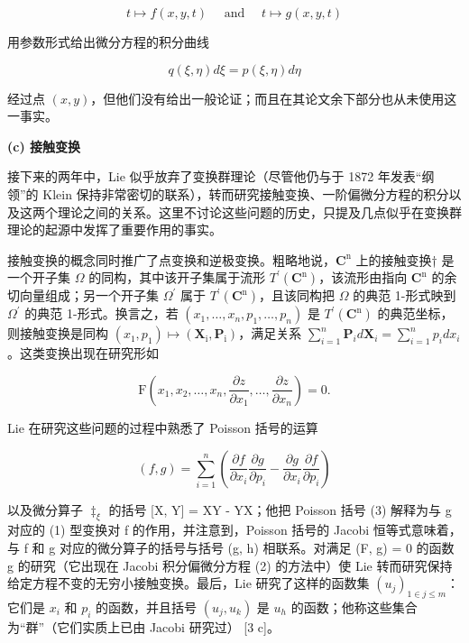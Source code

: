 \[
t \mapsto f (x, y, t) \quad \text { and } \quad t \mapsto g (x, y, t)
\]

用参数形式给出微分方程的积分曲线

\[
q (\xi , \eta) d \xi = p (\xi , \eta) d \eta
\]

经过点 \((x,y)\)，但他们没有给出一般论证；而且在其论文余下部分也从未使用这一事实。

\textbf{(c) 接触变换}

接下来的两年中，Lie 似乎放弃了变换群理论（尽管他仍与于 1872 年发表“纲领”的 Klein 保持非常密切的联系），转而研究接触变换、一阶偏微分方程的积分以及这两个理论之间的关系。这里不讨论这些问题的历史，只提及几点似乎在变换群理论的起源中发挥了重要作用的事实。

接触变换的概念同时推广了点变换和逆极变换。粗略地说，\(\mathbf{C}^{\mathrm{n}}\) 上的接触变换† 是一个开子集 \(\Omega\) 的同构，其中该开子集属于流形 \(T^{\prime}(\mathbf{C}^{\mathrm{n}})\)，该流形由指向 \(\mathbf{C}^{\mathrm{n}}\) 的余切向量组成；另一个开子集 \(\Omega^{\prime}\) 属于 \(T^{\prime}(\mathbf{C}^{\mathrm{n}})\)，且该同构把 \(\Omega\) 的典范 1-形式映到 \(\Omega^{\prime}\) 的典范 1-形式。换言之，若 \((x_{1},\ldots ,x_{n},p_{1},\ldots ,p_{n})\) 是 \(T^{\prime}(\mathbf{C}^{\mathrm{n}})\) 的典范坐标，则接触变换是同构 \((x_{1},p_{1})\mapsto (\mathbf{X}_{\mathrm{i}},\mathbf{P}_{\mathrm{i}})\)，满足关系 \(\sum_{i = 1}^{n}\mathbf{P}_{i}d\mathbf{X}_{i} = \sum_{i = 1}^{n}p_{i}dx_{i}\)。这类变换出现在研究形如

\[
\mathrm{F} \left(x _ {1}, x _ {2}, \dots , x _ {n}, \frac {\partial z}{\partial x _ {1}}, \dots , \frac {\partial z}{\partial x _ {n}}\right) = 0.\tag{2}
\]

Lie 在研究这些问题的过程中熟悉了 Poisson 括号的运算

\[
(f, g) = \sum_ {i = 1} ^ {n} \left(\frac {\partial f}{\partial x _ {i}} \frac {\partial g}{\partial p _ {i}} - \frac {\partial g}{\partial x _ {i}} \frac {\partial f}{\partial p _ {i}}\right)\tag{3}
\]

以及微分算子 \(\ddagger_{\xi}\) 的括号 {[}X, Y{]} = XY - YX；他把 Poisson 括号 (3) 解释为与 g 对应的 (1) 型变换对 f 的作用，并注意到，Poisson 括号的 Jacobi 恒等式意味着，与 f 和 g 对应的微分算子的括号与括号 (g, h) 相联系。对满足 (F, g) = 0 的函数 g 的研究（它出现在 Jacobi 积分偏微分方程 (2) 的方法中）使 Lie 转而研究保持给定方程不变的无穷小接触变换。最后，Lie 研究了这样的函数集 \((u_{j})_{1 \in j \leq m}\)：它们是 \(x_{i}\) 和 \(p_{i}\) 的函数，并且括号 \((u_{j}, u_{k})\) 是 \(u_{h}\) 的函数；他称这些集合为“群”（它们实质上已由 Jacobi 研究过） {[}3 c{]}。

